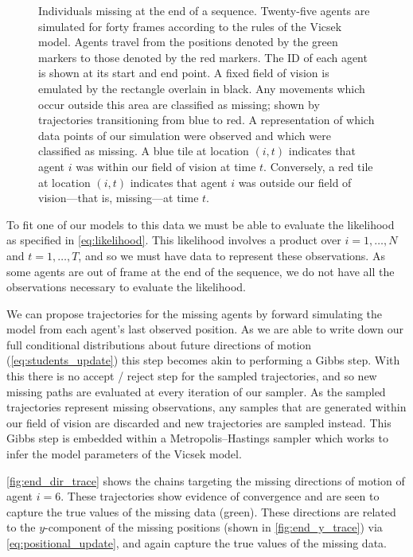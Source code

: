 \begin{figure}[tbp]
\begin{subfigure}[b]{0.5\textwidth}
    \caption{}
    \label{subfig:end_missing}
  \end{subfigure}
  \caption{Individuals missing at the end of a sequence.
   Twenty-five agents are simulated for forty frames
  according to the rules of the Vicsek model. Agents travel from the positions
  denoted by the green markers to those denoted by the red markers. The ID of
  each agent is shown at its start and end point. A fixed field of vision is
  emulated by the rectangle overlain in black. Any movements which occur
  outside this area are classified as missing; shown by trajectories
  transitioning from blue to red.
   A representation of which data points of our
  simulation were observed and which were classified as missing. A blue tile at
  location $(i, t)$ indicates that agent $i$ was within our field of vision at
  time $t$. Conversely, a red tile at location $(i, t)$ indicates that agent
  $i$ was outside our field of vision---that is, missing---at time $t$.}
  \label{fig:end_data}
\end{figure}

To fit one of our models to this data we must be able to evaluate the
likelihood as specified in \cref{eq:likelihood}. This likelihood involves a
product over $i=1,\ldots,N$ and $t=1,\ldots,T$, and so we must have data to
represent these observations. As some agents are out of frame at the end of the
sequence, we do not have all the observations necessary to evaluate the
likelihood.

We can propose trajectories for the missing agents by forward simulating the
model from each agent's last observed position. As we are able to write down
our full conditional distributions about future directions of motion
(\cref{eq:students_update}) this step becomes akin to performing a Gibbs step.
With this there is no accept / reject step for the sampled trajectories, and so
new missing paths are evaluated at every iteration of our sampler. As the
sampled trajectories represent missing observations, any samples that are
generated within our field of vision are discarded and new trajectories are
sampled instead. This Gibbs step is embedded within a Metropolis--Hastings
sampler which works to infer the model parameters of the Vicsek model.

\cref{fig:end_dir_trace} shows the chains targeting the missing directions of
motion of agent $i=6$. These trajectories show evidence of convergence and are
seen to capture the true values of the missing data (green). These directions
are related to the $y$-component of the missing positions (shown in
\cref{fig:end_y_trace}) via \cref{eq:positional_update}, and again capture the
true values of the missing data.

